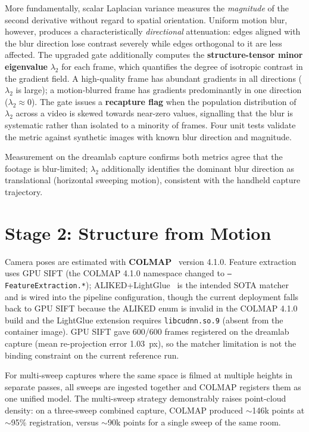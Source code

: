 More fundamentally, scalar Laplacian variance measures the \emph{magnitude} of the second
derivative without regard to spatial orientation.  Uniform motion blur, however, produces
a characteristically \emph{directional} attenuation: edges aligned with the blur direction
lose contrast severely while edges orthogonal to it are less affected.  The upgraded gate
additionally computes the \textbf{structure-tensor minor eigenvalue} $\lambda_2$ for each
frame, which quantifies the degree of isotropic contrast in the gradient field.  A
high-quality frame has abundant gradients in all directions ($\lambda_2$ is large);
a motion-blurred frame has gradients predominantly in one direction ($\lambda_2 \approx
0$).  The gate issues a \textbf{recapture flag} when the population distribution of
$\lambda_2$ across a video is skewed towards near-zero values, signalling that the blur is
systematic rather than isolated to a minority of frames.  Four unit tests validate the
metric against synthetic images with known blur direction and magnitude.

Measurement on the dreamlab capture confirms both metrics agree that the footage is
blur-limited; $\lambda_2$ additionally identifies the dominant blur direction as
translational (horizontal sweeping motion), consistent with the handheld capture
trajectory.

\section{Stage 2: Structure from Motion}
\label{sec:method:sfm}

Camera poses are estimated with \textbf{COLMAP}~\cite{schoenberger2016sfm} version 4.1.0.
Feature extraction uses GPU SIFT (the COLMAP 4.1.0 namespace changed to
\texttt{--FeatureExtraction.*}); ALIKED+LightGlue~\cite{lindenberger2023_lightglue} is the
intended SOTA matcher and is wired into the pipeline configuration, though the current
deployment falls back to GPU SIFT because the ALIKED enum is invalid in the COLMAP 4.1.0
build and the LightGlue extension requires \texttt{libcudnn.so.9} (absent from the
container image).  GPU SIFT gave 600/600 frames registered on the dreamlab capture (mean
re-projection error 1.03~px), so the matcher limitation is not the binding constraint on
the current reference run.

For multi-sweep captures where the same space is filmed at multiple heights in separate
passes, all sweeps are ingested together and COLMAP registers them as one unified model.
The multi-sweep strategy demonstrably raises point-cloud density: on a three-sweep
combined capture, COLMAP produced $\sim$146k points at $\sim$95\% registration, versus
$\sim$90k points for a single sweep of the same room.

